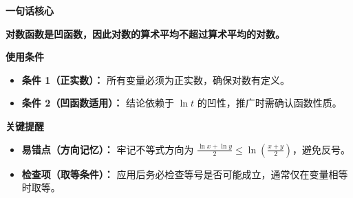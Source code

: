 \begin{summarybox}
\textbf{\textcolor{CSummary}{一句话核心}}

\textbf{对数函数是凹函数，因此对数的算术平均不超过算术平均的对数。}

\medskip
\textbf{\textcolor{CSummary}{使用条件}}
\begin{itemize}[leftmargin=*, itemsep=0.5em, topsep=0.4em]
    \item \textbf{条件 1（正实数）：} 所有变量必须为正实数，确保对数有定义。
    \item \textbf{条件 2（凹函数适用）：} 结论依赖于 $\ln t$ 的凹性，推广时需确认函数性质。
\end{itemize}

\medskip
\textbf{\textcolor{CSummary}{关键提醒}}
\begin{itemize}[leftmargin=*, itemsep=0.5em, topsep=0.4em]
    \item \textbf{易错点（方向记忆）：} 牢记不等式方向为 $\frac{\ln x + \ln y}{2} \leq \ln\!\left( \frac{x+y}{2} \right)$，避免反号。
    \item \textbf{检查项（取等条件）：} 应用后务必检查等号是否可能成立，通常仅在变量相等时取等。
\end{itemize}
\end{summarybox}
